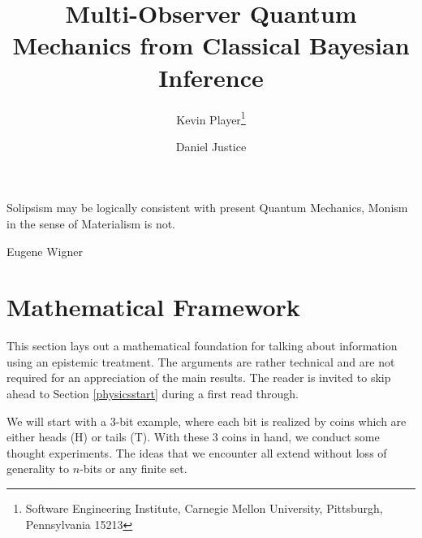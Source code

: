 \documentclass[12pt,a4paper]{article}
\theoremstyle{myrule}
\theoremstyle{postulate}
\theoremstyle{definition}
\begin{document}
\title{Multi-Observer Quantum Mechanics from Classical Bayesian Inference}



\author{
  Kevin Player\footnote{Software Engineering Institute, Carnegie Mellon University, Pittsburgh, Pennsylvania 15213}\\
   \and
   Daniel Justice\footnotemark[1]
}





\maketitle


\epigraph{Solipsism may be logically consistent with present Quantum Mechanics, Monism in the sense of Materialism is not.}{Eugene Wigner}


\section{Mathematical Framework}
This section lays out a mathematical foundation for talking about information using an epistemic treatment. The arguments are rather technical and are not required for an appreciation of the main results.  The reader is invited to skip ahead to Section \ref{physicsstart} during a first read through.

We will start with a 3-bit example, where each bit is realized by coins which are either heads (H) or tails (T).  With these 3 coins in hand, we conduct some thought experiments.  The ideas that we encounter all extend without loss of generality to $n$-bits or any finite set.
\end{document}
